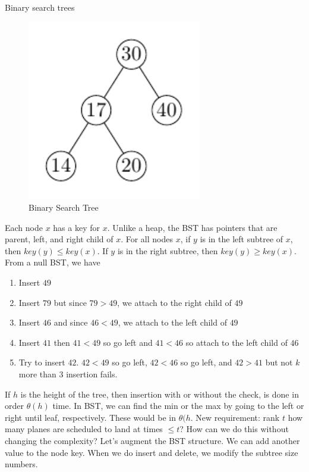 Binary search trees
\begin{figure}[h]
	\centering
	\includegraphics[width=3in]{binary_search_tree5.pdf}
	\caption{Binary Search Tree}
	\label{fig5:bst}
\end{figure}
Each node \(x\) has a key for \(x\). Unlike a heap, the BST has pointers that are parent, left, and right child of \(x\).
For all nodes \(x\), if \(y\) is in the left subtree of \(x\), then \(key(y)\leq key(x)\). If \(y\) is in the right subtree, then
\(key(y)\geq key(x)\). From a null BST, we have
\begin{enumerate}
	\item Insert \(49\)
	\item Insert \(79\) but since \(79 > 49\), we attach to the right child of \(49\)
	\item Insert \(46\) and since \(46 < 49\), we attach to the left child of \(49\)
	\item Insert \(41\) then \(41 < 49\) so go left and \(41 < 46\) so attach to the left child of \(46\)
	\item Try to insert \(42\). \(42 < 49\) so go left, \(42 < 46\) so go left, and \(42 > 41\) but not \(k\) more than \(3\)
	insertion fails.
\end{enumerate}
If \(h\) is the height of the tree, then insertion with or without the check, is done in order \(\theta(h)\) time. In BST, we
can find the min or the max by going to the left or right until leaf, respectively. These would be in \(\theta(h\).
New requirement: rank \(t\) how many planes are scheduled to land at times \(\leq t\)? How can we do this without
changing the complexity? Let's augment the BST structure. We can add another value to the node key. When we do 
insert and delete, we modify the subtree size numbers. 
